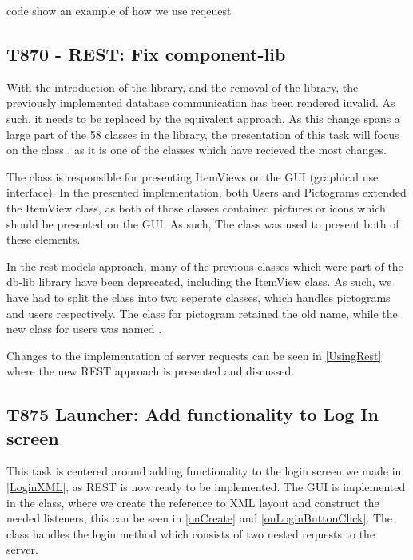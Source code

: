 code show an example of how we use reqeuest


\subsection{T870 - REST: Fix component-lib}
With the introduction of the  library, and the removal of the
 library, the previously implemented database communication has
been rendered invalid. As such, it needs to be replaced by the equivalent
 approach. As this change spans a large part of the 58
classes in the  library, the presentation of this task will
focus on the class , as it is one of the
classes which have recieved the most changes.\nl

The  class is responsible for presenting ItemViews
on the GUI (graphical use interface). In the presented implementation, both
Users and Pictograms extended the ItemView class, as both of those classes
contained pictures or icons which should be presented on the GUI. As such, The
 class was used to present both of these
elements.\nl

In the rest-models approach, many of the previous classes which were part of
the db-lib library have been deprecated, including the ItemView class. As such,
we have had to split the  class into two seperate
classes, which handles pictograms and users respectively. The class for
pictogram retained the old name, while the new class for users was named
.\nl

Changes to the implementation of server requests can be seen in
\autoref{UsingRest} where the new REST approach is presented and discussed.


\subsection{T875 Launcher: Add functionality to Log In screen}

This task is centered around adding functionality to the login screen we made
in \autoref{LoginXML}, as REST is now ready to be implemented. The GUI is
implemented in the  class, where we create the reference
to XML layout and construct the needed listeners, this can be seen in
\autoref{onCreate} and \autoref{onLoginButtonClick}. The 
class handles the login method which consists of two nested requests to the
server.\nl

